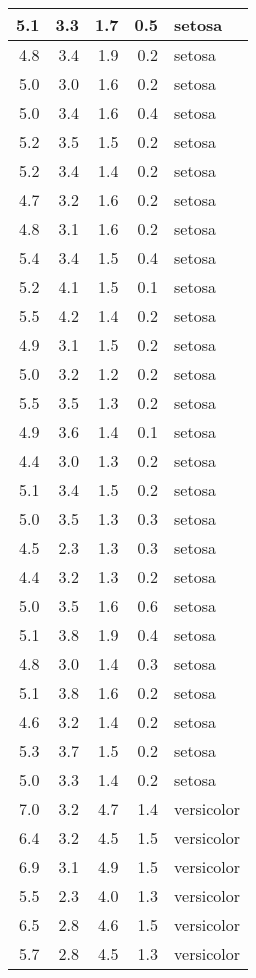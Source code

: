 \documentclass[]{article}
\begin{document}
\begin{tabular}{r|r|r|r|l}
\hline
5.1 & 3.3 & 1.7 & 0.5 & setosa\\
\hline
4.8 & 3.4 & 1.9 & 0.2 & setosa\\
\hline
5.0 & 3.0 & 1.6 & 0.2 & setosa\\
\hline
5.0 & 3.4 & 1.6 & 0.4 & setosa\\
\hline
5.2 & 3.5 & 1.5 & 0.2 & setosa\\
\hline
5.2 & 3.4 & 1.4 & 0.2 & setosa\\
\hline
4.7 & 3.2 & 1.6 & 0.2 & setosa\\
\hline
4.8 & 3.1 & 1.6 & 0.2 & setosa\\
\hline
5.4 & 3.4 & 1.5 & 0.4 & setosa\\
\hline
5.2 & 4.1 & 1.5 & 0.1 & setosa\\
\hline
5.5 & 4.2 & 1.4 & 0.2 & setosa\\
\hline
4.9 & 3.1 & 1.5 & 0.2 & setosa\\
\hline
5.0 & 3.2 & 1.2 & 0.2 & setosa\\
\hline
5.5 & 3.5 & 1.3 & 0.2 & setosa\\
\hline
4.9 & 3.6 & 1.4 & 0.1 & setosa\\
\hline
4.4 & 3.0 & 1.3 & 0.2 & setosa\\
\hline
5.1 & 3.4 & 1.5 & 0.2 & setosa\\
\hline
5.0 & 3.5 & 1.3 & 0.3 & setosa\\
\hline
4.5 & 2.3 & 1.3 & 0.3 & setosa\\
\hline
4.4 & 3.2 & 1.3 & 0.2 & setosa\\
\hline
5.0 & 3.5 & 1.6 & 0.6 & setosa\\
\hline
5.1 & 3.8 & 1.9 & 0.4 & setosa\\
\hline
4.8 & 3.0 & 1.4 & 0.3 & setosa\\
\hline
5.1 & 3.8 & 1.6 & 0.2 & setosa\\
\hline
4.6 & 3.2 & 1.4 & 0.2 & setosa\\
\hline
5.3 & 3.7 & 1.5 & 0.2 & setosa\\
\hline
5.0 & 3.3 & 1.4 & 0.2 & setosa\\
\hline
7.0 & 3.2 & 4.7 & 1.4 & versicolor\\
\hline
6.4 & 3.2 & 4.5 & 1.5 & versicolor\\
\hline
6.9 & 3.1 & 4.9 & 1.5 & versicolor\\
\hline
5.5 & 2.3 & 4.0 & 1.3 & versicolor\\
\hline
6.5 & 2.8 & 4.6 & 1.5 & versicolor\\
\hline
5.7 & 2.8 & 4.5 & 1.3 & versicolor\\

\end{tabular}
\end{document}
